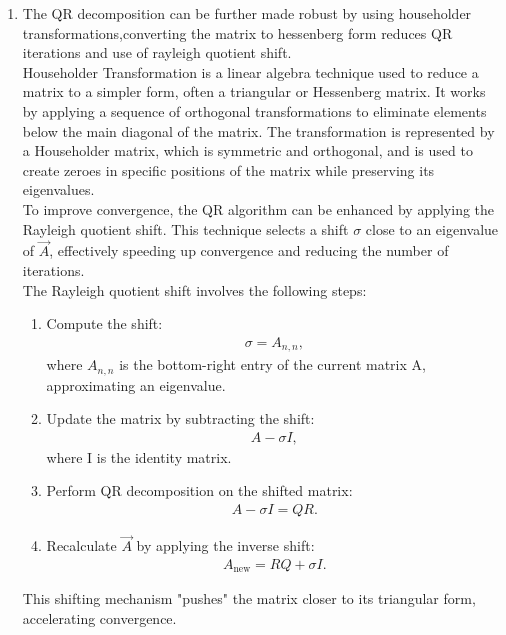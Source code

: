 \documentclass[journal]{IEEEtran}
\numberwithin{equation}{enumi}
\numberwithin{figure}{enumi}
\begin{document}
\begin{enumerate}
	\item The QR decomposition can be further made robust by using householder transformations,converting the matrix to hessenberg form reduces QR iterations and use of rayleigh quotient shift. \\
		Householder Transformation is a linear algebra technique used to reduce a matrix to a simpler form, often a triangular or Hessenberg matrix. It works by applying a sequence of orthogonal transformations to eliminate elements below the main diagonal of the matrix. The transformation is represented by a Householder matrix, which is symmetric and orthogonal, and is used to create zeroes in specific positions of the matrix while preserving its eigenvalues. \\
		To improve convergence, the QR algorithm can be enhanced by applying the Rayleigh quotient shift. This technique selects a shift $\sigma$ close to an eigenvalue of $\vec{A}$, effectively speeding up convergence and reducing the number of iterations. \\
		The Rayleigh quotient shift involves the following steps:
		\begin{enumerate}
			\item Compute the shift:
				\begin{align*}
				\sigma = A_{n,n},
				\end{align*}
				where $A_{n,n}$ is the bottom-right entry of the current matrix A, approximating an eigenvalue.
			\item Update the matrix by subtracting the shift:
				\begin{align*}
				A - \sigma I,
				\end{align*}
				where I is the identity matrix.
			\item Perform QR decomposition on the shifted matrix:
				\begin{align*}
				A - \sigma I = QR.
				\end{align*}
			\item Recalculate $\vec{A}$ by applying the inverse shift:
				\begin{align*}
				A_{\text{new}} = RQ + \sigma I.
				\end{align*}
				\end{enumerate}
This shifting mechanism "pushes" the matrix closer to its triangular form, accelerating convergence.
\end{enumerate}
\end{document}
